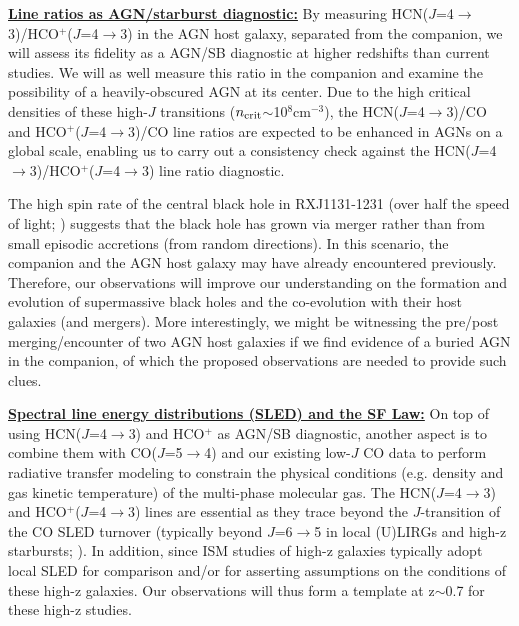 \documentclass[12pt,a4paper]{article}
\newcommand{\ncrit}{\mbox{$n_{\rm crit}$}\xspace}
\newcommand{\rarr}{$\rightarrow$}
\newcommand{\eco}{\mbox{CO($J$=5\rarr4)}\xspace}
\newcommand{\dhcn}{HCN($J$=4\rarr3)\xspace}
\newcommand{\hcop}{HCO$^+$\xspace}
\newcommand{\dhcop}{HCO$^+$($J$=4\rarr3)\xspace}
\begin{document}
\underline{\bf Line ratios as AGN/starburst diagnostic:}
By measuring \dhcn/\dhcop in the 
AGN host galaxy, separated from the companion, we will assess its fidelity as a 
AGN/SB diagnostic at higher redshifts than current studies. 
We will as well measure this ratio in the companion and examine the possibility of a 
heavily-obscured AGN at its center. 
Due to the high critical densities of these high-$J$ transitions (\ncrit$\sim$10$^{8}$cm$^{-3}$), 
the \dhcn/CO and \dhcop/CO line ratios are expected to 
be enhanced in AGNs on a global scale, enabling us to carry out a consistency check against the
\dhcn/\dhcop line ratio diagnostic.

The high spin rate of the central black hole in RXJ1131-1231 (over half the speed of light; \citealt{Reis14a})
suggests that the black hole has grown via merger
rather than from small episodic accretions (from random directions).
In this scenario, the companion and the AGN host galaxy may have already encountered previously.
Therefore, our observations will improve our understanding 
on the formation and evolution of supermassive black holes
and the co-evolution with their host galaxies (and mergers).
More interestingly, we might be witnessing the 
pre/post merging/encounter of two AGN host galaxies if we find evidence of a buried AGN in the companion, 
of which the proposed observations are needed to provide such clues.

\underline{\bf Spectral line energy distributions (SLED) and the SF Law:}
On top of using \dhcn and \hcop as AGN/SB diagnostic, another 
 aspect 
 is to 
combine them with \eco %
and our existing low-$J$ CO data to perform radiative transfer modeling 
to constrain the physical conditions 
(e.g. density and gas kinetic temperature) of the multi-phase molecular gas.
The \dhcn and \dhcop lines are essential as they trace beyond the $J$-transition of the CO SLED turnover
(typically beyond $J$=6\rarr5 in local (U)LIRGs and high-z starbursts; \citealt{Greve14a}).
In addition, since ISM studies of high-z galaxies typically adopt local SLED for comparison \citep[e.g.][]{Bothwell13a}
and/or for asserting assumptions on the conditions of these high-z galaxies.
Our observations will thus form a template at z$\sim$0.7 
for these high-z studies.
\end{document}
